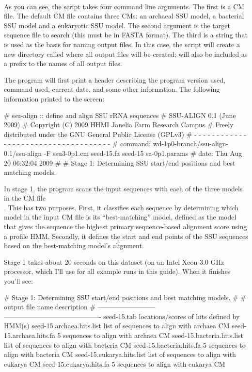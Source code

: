\\

As you can see, the  script takes four command line
arguments. The first is a CM file. The default CM file
 contains three CMs: an archaeal SSU model, a
bacterial SSU model and a eukaryotic SSU model. The second argument is
the target sequence file to search (this must be in FASTA format). The
third is a string that is used as the basis for naming output
files. In this case, the script will create a new directory called
 where all output files will be created; 
will also be included as a prefix to the names of all output files.

\newpage

The program will first print a header describing the program version
used, command used, current date, and some other information. 
The following information printed to the screen:

\begin{sreoutput}
# ssu-align :: define and align SSU rRNA sequences
# SSU-ALIGN 0.1 (June 2009)
# Copyright (C) 2009 HHMI Janelia Farm Research Campus
# Freely distributed under the GNU General Public License (GPLv3)
# - - - - - - - - - - - - - - - - - - - - - - - - - - - - - - - - - - - -
# command: wd-1p0-branch/ssu-align-0.1/ssu-align -F ssu3-0p1.cm seed-15.fa seed-15 sa-0p1.params
# date:    Thu Aug 20 06:32:04 2009
#
# Stage 1: Determining SSU start/end positions and best matching models.
\end{sreoutput}

In stage 1, the program scans the input sequences with each of the
three models in the CM file \\ . This has two
purposes.  First, it classifies each sequence by determining which
model in the input CM file is its ``best-matching'' model, defined as
the model that gives the sequence the highest primary sequence-based
alignment score using a profile HMM. Secondly, it
defines the start and end points of the SSU sequences based on the
best-matching model's alignment.

Stage 1 takes about 20 seconds on this dataset (on an Intel Xeon 3.0
GHz processor, which I'll use for all example runs in this
guide). When it finishes you'll see: 

\begin{sreoutput}
# Stage 1: Determining SSU start/end positions and best matching models.
#
# output file name            description                                
# --------------------------  -------------------------------------------
  seed-15.tab                 locations/scores of hits defined by HMM(s)
  seed-15.archaea.hits.list   list of sequences to align with archaea CM
  seed-15.archaea.hits.fa           5 sequences to align with archaea CM
  seed-15.bacteria.hits.list  list of sequences to align with bacteria CM
  seed-15.bacteria.hits.fa          5 sequences to align with bacteria CM
  seed-15.eukarya.hits.list   list of sequences to align with eukarya CM
  seed-15.eukarya.hits.fa           5 sequences to align with eukarya CM
\end{sreoutput}


